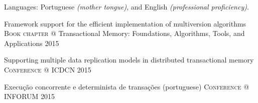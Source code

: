\documentclass[10pt,a4paper]{article}
\begin{document}


\spacedhrule{0.5em}{-0.4em}




\inlineheadsection
  {Languages:}
  {Portuguese \emph{(mother tongue)}, and English \emph{(professional proficiency)}.}


\spacedhrule{1.6em}{-0.4em}



\headedsection
  {Framework support for the efficient implementation of multiversion algorithms}
  {\textsc{Book chapter}} {%
  \headedsubsection
    {@ Transactional Memory: Foundations, Algorithms, Tools, and Applications}
    {2015}
    {}
}

\headedsection
  {Supporting multiple data replication models in distributed transactional memory}
  {\textsc{Conference}} {%
  \headedsubsection
    {@ ICDCN}
    {2015}
    {}
}

\headedsection
  {Execu\c{c}\~{a}o concorrente e determinista de transa\c{c}\~{o}es (portuguese)}
  {\textsc{Conference}} {%
  \headedsubsection
    {@ INFORUM}
    {2015}
    {}
}
\end{document}
